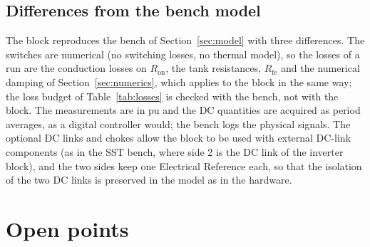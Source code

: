 \documentclass[12pt,a4paper]{scrartcl}
\newcommand{\ped}[1]{_{\mathrm{#1}}}
\begin{document}
\begin{onehalfspace}
\subsection{Differences from the bench model}
\label{sec:differences}

The block reproduces the bench of Section~\ref{sec:model} with three differences. The switches are numerical (no switching losses, no thermal model), so the losses of a run are the conduction losses on $R\ped{on}$, the tank resistances, $R\ped{fe}$ and the numerical damping of Section~\ref{sec:numerics}, which applies to the block in the same way; the loss budget of Table~\ref{tab:losses} is checked with the bench, not with the block. The measurements are in pu and the DC quantities are acquired as period averages, as a digital controller would; the bench logs the physical signals. The optional DC links and chokes allow the block to be used with external DC-link components (as in the SST bench, where side 2 is the DC link of the inverter block), and the two sides keep one Electrical Reference each, so that the isolation of the two DC links is preserved in the model as in the hardware.

\section{Open points}
\label{sec:open}


\end{onehalfspace}
\end{document}
